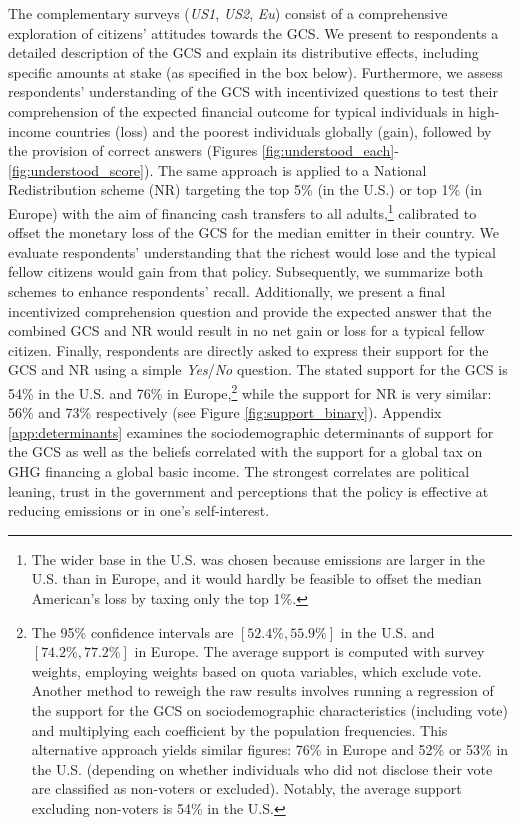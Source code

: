 The complementary surveys (\textit{US1}, \textit{US2}, \textit{Eu}) consist of a comprehensive exploration of citizens' attitudes towards the GCS. We present to respondents a detailed description of the GCS and explain its distributive effects, including specific amounts at stake (as specified in the box below). Furthermore, we assess respondents' understanding of the GCS with incentivized questions to test their comprehension of the expected financial outcome for typical individuals in high-income countries (loss) and the poorest individuals globally (gain), followed by the provision of correct answers (Figures \ref{fig:understood_each}-\ref{fig:understood_score}). %
The same approach is applied to a National Redistribution scheme (NR) targeting the top 5\% (in the U.S.) or top 1\% (in Europe) with the aim of financing cash transfers to all adults,\footnote{The wider base in the U.S. was chosen because emissions are larger in the U.S. than in Europe, and it would hardly be feasible to offset the median American's loss by taxing only the top 1\%.} calibrated to offset the monetary loss of the GCS for the median emitter in their country. We evaluate respondents' understanding that the richest would lose and the typical fellow citizens would gain from that policy. %
Subsequently, we summarize both schemes to enhance respondents' recall. Additionally, we present a final incentivized comprehension question and provide the expected answer that the combined GCS and NR would result in no net gain or loss for a typical fellow citizen. Finally, respondents are directly asked to express their support for the GCS and NR using a simple \textit{Yes}/\textit{No} question.
The stated support for the GCS is 54\% in the U.S. and 76\% in Europe,\footnote{The 95\% confidence intervals are $[52.4\%, 55.9\%]$ in the U.S. and $[74.2\%, 77.2\%]$ in Europe. The average support is computed with survey weights, employing weights based on quota variables, which exclude vote. Another method to reweigh the raw results involves running a regression of the support for the GCS on sociodemographic characteristics (including vote) and multiplying each coefficient by the population frequencies. This alternative approach yields similar figures: 76\% in Europe and 52\% or 53\% in the U.S. (depending on whether individuals who did not disclose their vote are classified as non-voters or excluded). Notably, the average support excluding non-voters is 54\% in the U.S.} while the support for NR is very similar: 56\% and 73\% respectively (see Figure \ref{fig:support_binary}). Appendix \ref{app:determinants} examines the sociodemographic determinants of support for the GCS as well as the beliefs correlated with the support for a global tax on GHG financing a global basic income. The strongest correlates are political leaning, trust in the government and perceptions that the policy is effective at reducing emissions or in one's self-interest. %

